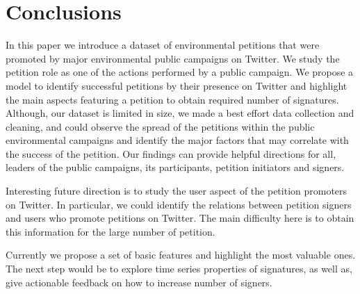 \section{Conclusions}
In this paper we introduce a dataset of environmental petitions that were promoted by major environmental public campaigns on Twitter.
We study the petition role as one of the actions performed by a public campaign.
We propose a model to identify successful petitions by their presence on Twitter and highlight the main aspects featuring a petition to obtain required number of signatures.
Although, our dataset is limited in size, we made a best effort data collection and cleaning, and could observe the spread of the petitions within the public environmental campaigns and identify the major factors that may correlate with the success of the petition.
Our findings can provide helpful directions for all, leaders of the public campaigns, its participants, petition initiators and signers.

Interesting future direction is to study the user aspect of the petition promoters on Twitter. In particular, we could identify the relations between petition signers and users who promote petitions on Twitter. The main difficulty here is to obtain this information for the large number of petition.

Currently we propose a set of basic features and highlight the most valuable ones. The next step would be to explore time series properties of signatures, as well as, give actionable feedback on how to increase number of signers.
